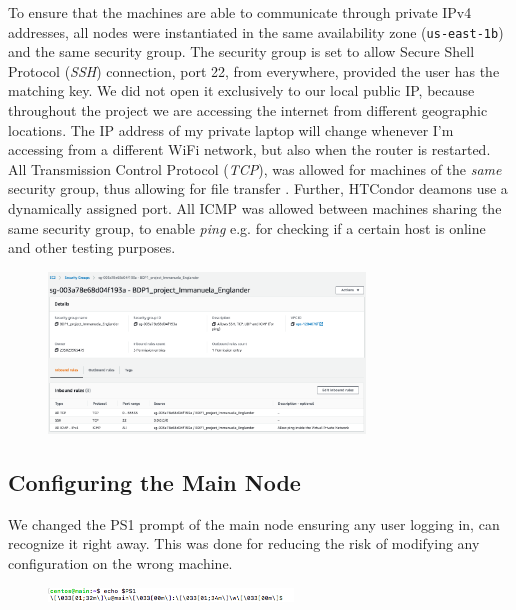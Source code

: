 \documentclass{article}
\begin{document}
To ensure that the machines are able to communicate through private IPv4 addresses, all nodes were instantiated in the same availability zone (\texttt{us-east-1b}) and the same security group. 
The security group is set to allow Secure Shell Protocol (\textit{SSH}) connection, port 22, from everywhere, provided the user has the matching key.
We did not open it exclusively to our local public IP, because throughout the project we are accessing the internet from different geographic locations. 
The IP address of my private laptop will change whenever I'm accessing from a different WiFi network, but also when the router is restarted. 
All Transmission Control Protocol (\textit{TCP}), was allowed for machines of the \textit{same} security group, thus allowing for file transfer \cite{cerf_protocol_1974}. 
Further, HTCondor deamons use a dynamically assigned port. 
All ICMP was allowed between machines sharing the same security group, to enable \textit{ping} e.g. for checking if a certain host is online and other testing purposes.
\begin{figure}[!h]
    \includegraphics[width=0.75\textwidth]{./img/security_groups.png}
\end{figure}
\newpage
\subsection{Configuring the Main Node}
We changed the PS1 prompt of the main node ensuring any user logging in, can recognize it right away.
This was done for reducing the risk of modifying any configuration on the wrong machine.

\begin{figure}[!h]
    \includegraphics[width=0.58\textwidth]{./img/prompt.png}
\end{figure}
\FloatBarrier%
\end{document}
